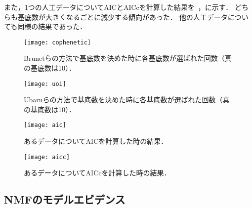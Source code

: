 また，1つの人工データについてAICとAICcを計算した結果を~，に示す．
どちらも基底数が大きくなるごとに減少する傾向があった．
他の人工データについても同様の結果であった．

\begin{figure}[htbp]
    \begin{minipage}{0.5\hsize}
        \begin{center}
            \texttt{[image: cophenetic]}
						\caption{Brunetらの方法で基底数を決めた時に各基底数が選ばれた回数（真の基底数は10）．}
            \label{fig:cophenetic}
        \end{center}
    \end{minipage}
    \begin{minipage}{0.5\hsize}
        \begin{center}
            \texttt{[image: uoi]}
						\caption{Ubaruらの方法で基底数を決めた時に各基底数が選ばれた回数（真の基底数は10）．}
            \label{fig:uoi}
        \end{center}
    \end{minipage}
\end{figure}
\begin{figure}[htbp]
    \begin{minipage}{0.5\hsize}
        \begin{center}
            \texttt{[image: aic]}
						\caption{あるデータについてAICを計算した時の結果．}
            \label{fig:aic}
        \end{center}
    \end{minipage}
    \begin{minipage}{0.5\hsize}
        \begin{center}
						\texttt{[image: aicc]}
						\caption{あるデータについてAICc\cite{Symonds2011}を計算した時の結果．}
            \label{fig:aicc}
        \end{center}
    \end{minipage}
\end{figure}

\subsection{NMFのモデルエビデンス}
